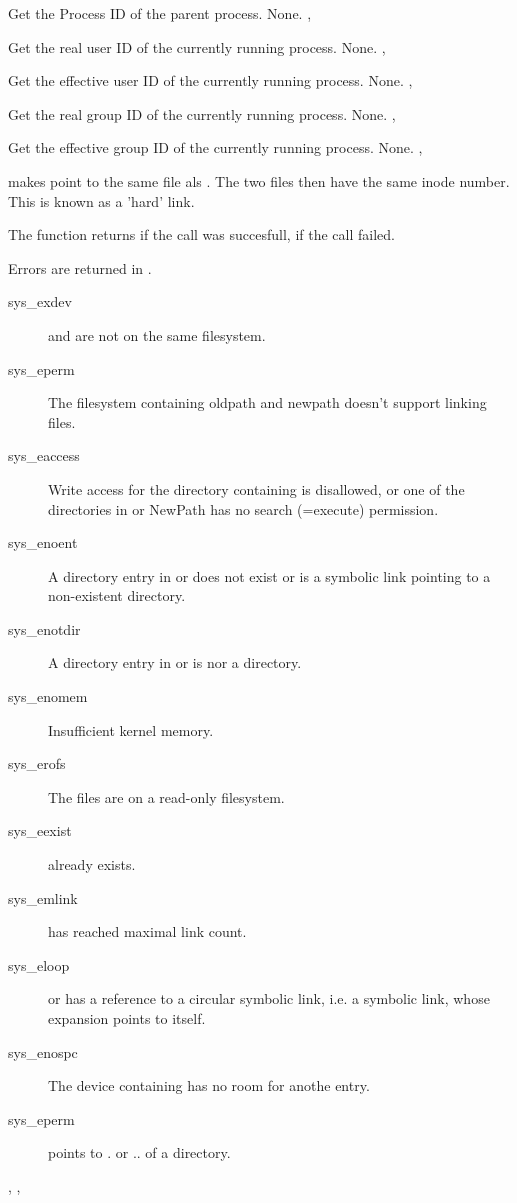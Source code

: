 { Get the Process ID of the parent process.}
{None.}
{, }



{ Get the real user ID of the currently running process.}
{None.}
{,  }



{ Get the effective user ID of the currently running process.}
{None.}
{,  }



{ Get the real group ID of the currently running process.}
{None.}
{,  }



{ Get the effective group ID of the currently running process.}
{None.}
{,  }



{ makes  point to the same file als . The two files
then have the same inode number. This is known as a 'hard' link.

The function returns  if the call was succesfull,  if the call
failed.
}
{ Errors are returned in .
\begin{description}
\item[sys\_exdev]  and  are not on the same
filesystem.
\item[sys\_eperm] The filesystem containing oldpath and newpath doesn't
support linking files.
\item[sys\_eaccess] Write access for the directory containing 
is disallowed, or one of the directories in  or {NewPath} has no
search (=execute) permission.
\item[sys\_enoent] A directory entry in  or  does
not exist or is a symbolic link pointing to a non-existent directory.
\item[sys\_enotdir] A directory entry in  or  is
nor a directory.
\item[sys\_enomem] Insufficient kernel memory.
\item[sys\_erofs] The files are on a read-only filesystem.
\item[sys\_eexist]  already exists.
\item[sys\_emlink]  has reached maximal link count.
\item[sys\_eloop]  or  has a reference to a circular
symbolic link, i.e. a symbolic link, whose expansion points to itself.
\item[sys\_enospc] The device containing  has no room for anothe
entry.
\item[sys\_eperm]  points to . or .. of a directory.
\end{description}
}
{, ,  }

